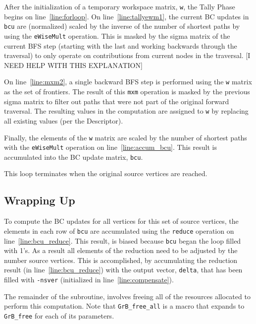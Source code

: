 After the initialization of a temporary workspace matrix, {\tt w}, the Tally
Phase begins on line~\ref{line:forloop}.  On line~\ref{line:tallyewm1}, the
current BC updates in {\tt bcu} are (normalized) scaled by the inverse of the
number of shortest paths by using the {\tt eWiseMult} operation.  This is masked
by the sigma matrix of the current BFS step (starting with the last and working
backwards through the traversal) to only operate on contributions from current
nodes in the traversal.  [I NEED HELP WITH THIS EXPLANATION]

On line~\ref{line:mxm2}, a single backward BFS step is performed using the {\tt w}
matrix as the set of frontiers.  The result of this {\tt mxm} operation is masked
by the previous sigma matrix to filter out paths that were not part of the original
forward traversal.  The resulting values in the computation are assigned to {\tt w}
by replacing all existing values (per the Descriptor).

Finally, the elements of the {\tt w} matrix are scaled by the number of shortest
paths with the {\tt eWiseMult} operation on line~\ref{line:accum_bcu}.  This result
is accumulated into the BC update matrix, {\tt bcu}.

This loop terminates when the original source vertices are reached.

\subsection{Wrapping Up}

To compute the BC updates for all vertices for this set of source vertices, 
the elements in each row of {\tt bcu} are accumulated using the {\tt reduce} 
operation on line~\ref{line:bcu_reduce}.  This result, is biased because 
{\tt bcu} began the loop filled with 1's.  As a result all elements of the reduction 
need to be adjusted by the number source vertices.  This is accomplished, by
accumulating the reduction result (in line~\ref{line:bcu_reduce}) with the output
vector, {\tt delta}, 
that has been filled with {\tt -nsver} (initialized in line~\ref{line:compensate}).

The remainder of the subroutine, involves freeing all of the resources allocated
to perform this computation.  Note that {\tt GrB\_free\_all} is a macro that 
expands to {\tt GrB\_free} for each of its parameters.